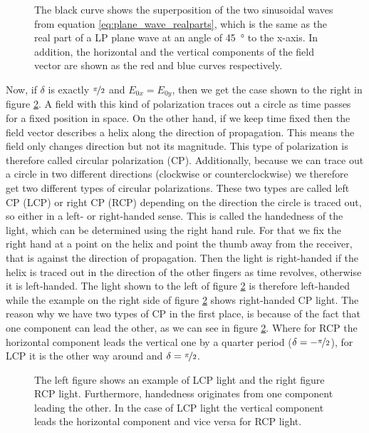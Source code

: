 \begin{figure}[h]
    \centering
    
    \caption{The black curve shows the superposition of the two sinusoidal waves from equation \ref{eq:plane_wave_realparts}, which is the same as the real part of a LP plane wave at an angle of \SI{45}{\degree} to the x-axis. In addition, the horizontal and the vertical components of the field vector are shown as the red and blue curves respectively.}
    \label{fig:E_planewave}
\end{figure}

Now, if $\delta$ is exactly $\nicefrac{\pi}{2}$ and $E_{0x} = E_{0y}$, then we get the case shown to the right in figure \ref{fig:circ_pol_planewave}. A field with this kind of polarization traces out a circle as time passes for a fixed position in space. On the other hand, if we keep time fixed then the field vector describes a helix along the direction of propagation. This means the field only changes direction but not its magnitude. This type of polarization is therefore called circular polarization (CP). Additionally, because we can trace out a circle in two different directions (clockwise or counterclockwise) we therefore get two different types of circular polarizations. These two types are called left CP (LCP) or right CP (RCP) depending on the direction the circle is traced out, so either in a left- or right-handed sense. This is called the handedness of the light, which can be determined using the right hand rule. For that we fix the right hand at a point on the helix and point the thumb away from the receiver, that is against the direction of propagation. Then the light is right-handed if the helix is traced out in the direction of the other fingers as time revolves, otherwise it is left-handed. The light shown to the left of figure \ref{fig:circ_pol_planewave} is therefore left-handed while the example on the right side of figure \ref{fig:circ_pol_planewave} shows right-handed CP light. The reason why we have two types of CP in the first place, is because of the fact that one component can lead the other, as we can see in figure \ref{fig:circ_pol_planewave}. Where for RCP the horizontal component leads the vertical one by a quarter period ($\delta = -\nicefrac{\pi}{2}$), for LCP it is the other way around and $\delta = \nicefrac{\pi}{2}$. 

\begin{figure}[h]
\centering
    \begin{subfigure}
        \centering
        
    \end{subfigure}
    \begin{subfigure}
        \centering
        
    \end{subfigure}
    \caption{The left figure shows an example of LCP light and the right figure RCP light. Furthermore, handedness originates from one component leading the other. In the case of LCP light the vertical component leads the horizontal component and vice versa for RCP light.}
    \label{fig:circ_pol_planewave}
\end{figure}

